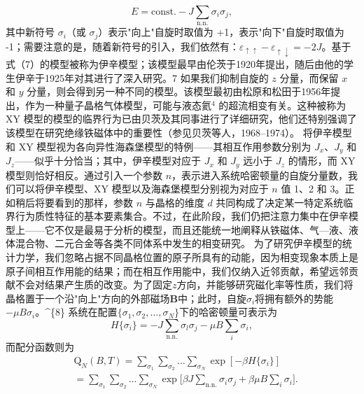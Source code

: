 \begin{equation}\tag{12.3.6}\label{eq:12.3.6}
E = \mathrm { c o n s t . } - J \sum _ { \mathrm { n . n . } } \sigma _ { i } \sigma _ { j } ,
\end{equation}
其中新符号 \(\sigma_{i}\)（或 \(\sigma_{j}\)）表示"向上"自旋时取值为 +1，表示"向下"自旋时取值为 -1；需要注意的是，随着新符号的引入，我们依然有：\(\varepsilon_{\uparrow\uparrow} - \varepsilon_{\uparrow\downarrow} = -2J\)。基于式（7）的模型被称为伊辛模型；该模型最早由伦茨于1920年提出，随后由他的学生伊辛于1925年对其进行了深入研究。7
如果我们抑制自旋的 \(z\) 分量，而保留 \(x\) 和 \(y\) 分量，则会得到另一种不同的模型。该模型最初由松原和松田于1956年提出，作为一种量子晶格气体模型，可能与液态氦\(^{4}\) 的超流相变有关。这种被称为 XY 模型的模型的临界行为已由贝茨及其同事进行了详细研究，他们还特别强调了该模型在研究绝缘铁磁体中的重要性（参见贝茨等人，1968--1974）。
将伊辛模型和 XY 模型视为各向异性海森堡模型的特例——其相互作用参数分别为 \(J_{x}\)、\(J_{y}\) 和 \(J_{z}\)——似乎十分恰当；其中，伊辛模型对应于 \(J_{x}\) 和 \(J_{y}\) 远小于 \(J_{z}\) 的情形，而 XY 模型则恰好相反。通过引入一个参数 \(n\)，表示进入系统哈密顿量的自旋分量数，我们可以将伊辛模型、XY 模型以及海森堡模型分别视为对应于 \(n\) 值 1、2 和 3。正如稍后将要看到的那样，参数 \(n\) 与晶格的维度 \(d\) 共同构成了决定某一特定系统临界行为质性特征的基本要素集合。不过，在此阶段，我们仍把注意力集中在伊辛模型上——它不仅是最易于分析的模型，而且还能统一地阐释从铁磁体、气---液、液体混合物、二元合金等各类不同体系中发生的相变研究。
为了研究伊辛模型的统计力学，我们忽略占据不同晶格位置的原子所具有的动能，因为相变现象本质上是原子间相互作用能的结果；而在相互作用能中，我们仅纳入近邻贡献，希望远邻贡献不会对结果产生质的改变。为了固定\(z\)方向，并能够研究磁化率等性质，我们将晶格置于一个沿"向上"方向的外部磁场\(\boldsymbol{B}\)中；此时，自旋\(\sigma_{i}\)将拥有额外的势能\(-\mu B \sigma_{i}\)。\^{}\{8\} 系统在配置\(\{\sigma_{1}, \sigma_{2}, \ldots, \sigma_{N}\}\)下的哈密顿量可表示为
\begin{equation}\tag{12.3.7}\label{eq:12.3.7}
H \{ \sigma _ { i } \} = - J \sum _ { \mathrm { n . n . } } \sigma _ { l } \sigma _ { j } - \mu B \sum _ { i } \sigma _ { i } ,
\end{equation}
而配分函数则为
\begin{equation}\tag{12.3.8}\label{eq:12.3.8}
\begin{array}{rl} & { \mathrm { Q } _ { N } ( B , T ) = \sum _ { \sigma _ { 1 } } \sum _ { \sigma _ { 2 } } \ldots \sum _ { \sigma _ { N } } \exp [ - \beta H \{ \sigma _ { i } \} ] } \\& {  = \sum _ { \sigma _ { 1 } } \sum _ { \sigma _ { 2 } } \ldots \sum _ { \sigma _ { N } } \exp \Big [ \beta J \sum _ { \mathrm { n . n . } } \sigma _ { i } \sigma _ { j } + \beta \mu B \sum _ { i } \sigma _ { i } \Big ] . } \end{array}
\end{equation}
